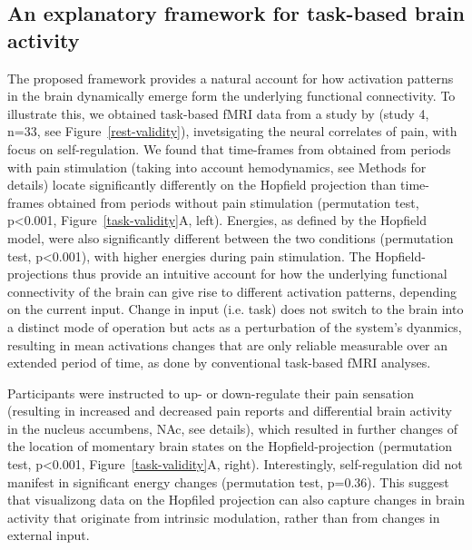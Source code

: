 \documentclass{article}
\begin{document}
\subsection{An explanatory framework for task-based brain activity}\label{An explanatory framework for task-based brain activity}

The proposed framework provides a natural account for how activation patterns in the brain dynamically emerge form the underlying functional connectivity. To illustrate this, we obtained task-based fMRI data from a study by \href{https://doi.org/10.1371/journal.pbio.1002036}{} (study 4, n=33, see Figure~\ref{rest-validity}), invetsigating the neural correlates of pain, with focus on self-regulation.
We found that time-frames from obtained from periods with pain stimulation (taking into account hemodynamics, see Methods for details) locate significantly differently on the Hopfield projection than time-frames obtained from periods without pain stimulation (permutation test, p\textless 0.001, Figure~\ref{task-validity}A, left). Energies, as defined by the Hopfield model, were also significantly different between the two conditions (permutation test, p\textless 0.001), with higher energies during pain stimulation. The Hopfield-projections thus provide an intuitive account for how the underlying functional connectivity of the brain can give rise to different activation patterns, depending on the current input. Change in input (i.e. task) does not switch to the brain into a distinct mode of operation but acts as a perturbation of the system's dyanmics, resulting in mean activations changes that are only reliable measurable over an extended period of time, as done by conventional task-based fMRI analyses.

Participants were instructed to up- or down-regulate their pain sensation (resulting in increased and decreased pain reports and differential brain activity in the nucleus accumbens, NAc, see \href{https://doi.org/10.1371/journal.pbio.1002036}{} details), which resulted in further changes of the location of momentary brain states on the Hopfield-projection (permutation test, p\textless 0.001, Figure~\ref{task-validity}A, right). Interestingly, self-regulation did not manifest in significant energy changes (permutation test, p=0.36). This suggest that visualizong data on the Hopfiled projection can also capture changes in brain activity that originate from intrinsic modulation, rather than from changes in external input.
\end{document}
